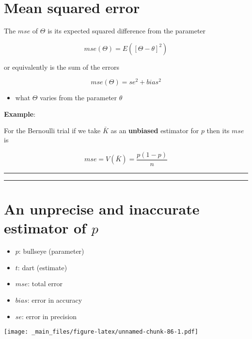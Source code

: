 \documentclass[
]{book}
\providecommand{\tightlist}{%
  \setlength{\itemsep}{0pt}\setlength{\parskip}{0pt}}
\begin{document}
\hypertarget{mean-squared-error}{%
\section{Mean squared error}\label{mean-squared-error}}

The \(mse\) of \(\Theta\) is its expected squared difference from the parameter

\[mse(\Theta)=E([\Theta - \theta]^2)\]

or equivalently is the sum of the errors

\[mse(\Theta)=se^2 + bias^2\]

\begin{itemize}
\tightlist
\item
  what \(\Theta\) varies from the parameter \(\theta\)
\end{itemize}

\textbf{Example}:

For the Bernoulli trial if we take \(\bar{K}\) as an \textbf{unbiased} estimator for \(p\) then its \(mse\) is

\[mse=V(\bar{K})=\frac{p(1-p)}{n}\]

\begin{center}\rule{0.5\linewidth}{0.5pt}\end{center}

\begin{center}\rule{0.5\linewidth}{0.5pt}\end{center}

\hypertarget{an-unprecise-and-inaccurate-estimator-of-p}{%
\section{\texorpdfstring{An unprecise and inaccurate estimator of \(p\)}{An unprecise and inaccurate estimator of p}}\label{an-unprecise-and-inaccurate-estimator-of-p}}

\begin{itemize}
\tightlist
\item
  \(p\): bullseye (parameter)
\item
  \(t\): dart (estimate)
\item
  \(mse\): total error
\item
  \(bias\): error in accuracy
\item
  \(se\): error in precision
\end{itemize}

\texttt{[image: \_main\_files/figure-latex/unnamed-chunk-86-1.pdf]}
\end{document}
